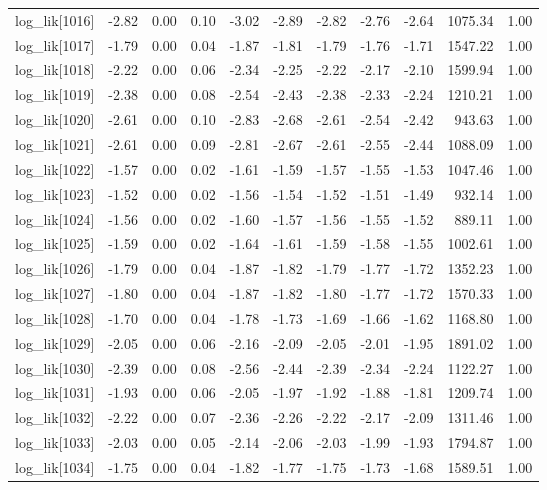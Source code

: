 \begin{table}[ht]
\begin{tabular}{rrrrrrrrrrr}
  log\_lik[1016] & -2.82 & 0.00 & 0.10 & -3.02 & -2.89 & -2.82 & -2.76 & -2.64 & 1075.34 & 1.00 \\ 
  log\_lik[1017] & -1.79 & 0.00 & 0.04 & -1.87 & -1.81 & -1.79 & -1.76 & -1.71 & 1547.22 & 1.00 \\ 
  log\_lik[1018] & -2.22 & 0.00 & 0.06 & -2.34 & -2.25 & -2.22 & -2.17 & -2.10 & 1599.94 & 1.00 \\ 
  log\_lik[1019] & -2.38 & 0.00 & 0.08 & -2.54 & -2.43 & -2.38 & -2.33 & -2.24 & 1210.21 & 1.00 \\ 
  log\_lik[1020] & -2.61 & 0.00 & 0.10 & -2.83 & -2.68 & -2.61 & -2.54 & -2.42 & 943.63 & 1.00 \\ 
  log\_lik[1021] & -2.61 & 0.00 & 0.09 & -2.81 & -2.67 & -2.61 & -2.55 & -2.44 & 1088.09 & 1.00 \\ 
  log\_lik[1022] & -1.57 & 0.00 & 0.02 & -1.61 & -1.59 & -1.57 & -1.55 & -1.53 & 1047.46 & 1.00 \\ 
  log\_lik[1023] & -1.52 & 0.00 & 0.02 & -1.56 & -1.54 & -1.52 & -1.51 & -1.49 & 932.14 & 1.00 \\ 
  log\_lik[1024] & -1.56 & 0.00 & 0.02 & -1.60 & -1.57 & -1.56 & -1.55 & -1.52 & 889.11 & 1.00 \\ 
  log\_lik[1025] & -1.59 & 0.00 & 0.02 & -1.64 & -1.61 & -1.59 & -1.58 & -1.55 & 1002.61 & 1.00 \\ 
  log\_lik[1026] & -1.79 & 0.00 & 0.04 & -1.87 & -1.82 & -1.79 & -1.77 & -1.72 & 1352.23 & 1.00 \\ 
  log\_lik[1027] & -1.80 & 0.00 & 0.04 & -1.87 & -1.82 & -1.80 & -1.77 & -1.72 & 1570.33 & 1.00 \\ 
  log\_lik[1028] & -1.70 & 0.00 & 0.04 & -1.78 & -1.73 & -1.69 & -1.66 & -1.62 & 1168.80 & 1.00 \\ 
  log\_lik[1029] & -2.05 & 0.00 & 0.06 & -2.16 & -2.09 & -2.05 & -2.01 & -1.95 & 1891.02 & 1.00 \\ 
  log\_lik[1030] & -2.39 & 0.00 & 0.08 & -2.56 & -2.44 & -2.39 & -2.34 & -2.24 & 1122.27 & 1.00 \\ 
  log\_lik[1031] & -1.93 & 0.00 & 0.06 & -2.05 & -1.97 & -1.92 & -1.88 & -1.81 & 1209.74 & 1.00 \\ 
  log\_lik[1032] & -2.22 & 0.00 & 0.07 & -2.36 & -2.26 & -2.22 & -2.17 & -2.09 & 1311.46 & 1.00 \\ 
  log\_lik[1033] & -2.03 & 0.00 & 0.05 & -2.14 & -2.06 & -2.03 & -1.99 & -1.93 & 1794.87 & 1.00 \\ 
  log\_lik[1034] & -1.75 & 0.00 & 0.04 & -1.82 & -1.77 & -1.75 & -1.73 & -1.68 & 1589.51 & 1.00 \\ 

\end{tabular}
\end{table}
